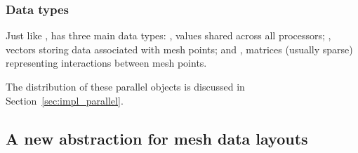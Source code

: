 \subsubsection{Data types}

Just like ,  has three main data types:
, values shared across all processors;
, vectors storing data associated with mesh points;
and , matrices (usually sparse) representing interactions between mesh points.

The distribution of these parallel objects is discussed in Section~\ref{sec:impl_parallel}.

\subsection{A new abstraction for mesh data layouts}
\label{sec:impl_datalayout}

